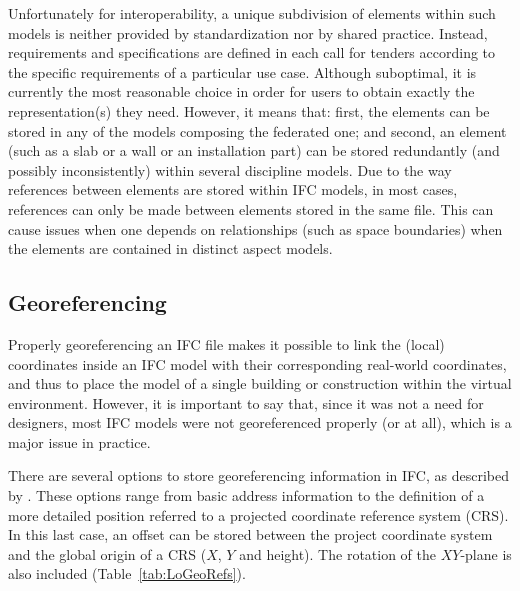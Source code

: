Unfortunately for interoperability, a unique subdivision of elements within such models is neither provided by standardization nor by shared practice.
Instead, requirements and specifications are defined in each call for tenders according to the specific requirements of a particular use case.
Although suboptimal, it is currently the most reasonable choice in order for users to obtain exactly the representation(s) they need.
However, it means that: first, the elements can be stored in any of the models composing the federated one; and second, an element (such as a slab or a wall or an installation part) can be stored redundantly (and possibly inconsistently) within several discipline models.
Due to the way references between elements are stored within IFC models, in most cases, references can only be made between elements stored in the same file. This can cause issues when one depends on relationships (such as space boundaries) when the elements are contained in distinct aspect models.
%


\subsection{Georeferencing}

Properly georeferencing an IFC file makes it possible to link the (local) coordinates inside an IFC model with their corresponding real-world coordinates, and thus to place the model of a single building or construction within the virtual environment.
However, it is important to say that, since it was not a need for designers, most IFC models were not georeferenced properly (or at all), which is a major issue in practice.


There are several options to store georeferencing information in IFC, as described by \citet{clemen2019level}.
These options range from basic address information to the definition of a more detailed position referred to a projected coordinate reference system (CRS).
In this last case, an offset can be stored between the project coordinate system and the global origin of a CRS ($X$, $Y$ and height).
The rotation of the $XY$-plane is also included (Table~\ref{tab:LoGeoRefs}).

